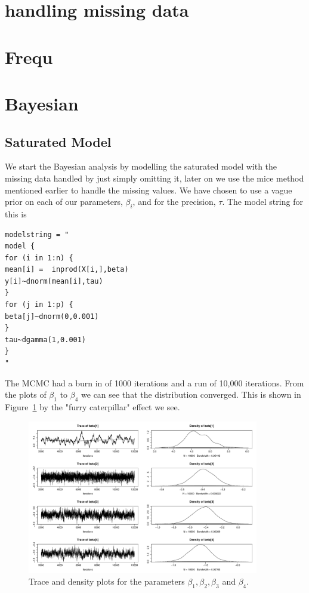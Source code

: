 \documentclass{article}
\begin{document}
\section{handling missing data}
\label{handling}
\section{Frequ}
\section{Bayesian}
\subsection{Saturated Model}
We start the Bayesian analysis by modelling the saturated model with the missing data handled by just simply omitting it, later on we use the mice method mentioned earlier to handle the missing values. We have chosen to use a vague prior on each of our parameters, $\beta_i$, and for the precision, $\tau$. The model string  for this is 
\begin{verbatim}
modelstring = "
model {
for (i in 1:n) {
mean[i] =  inprod(X[i,],beta)
y[i]~dnorm(mean[i],tau)
}
for (j in 1:p) {
beta[j]~dnorm(0,0.001)
}
tau~dgamma(1,0.001)
}
"
\end{verbatim}
The MCMC had a burn in of 1000 iterations and a run of 10,000 iterations. From the plots of $\beta_1$ to $\beta_4$ we can see that the distribution converged. This is shown in Figure~\ref{saturated_beta1-4} by the "furry caterpillar" effect we see.
\begin{figure}[H]
\centering
\includegraphics[width = 0.9\textwidth]{saturatedOutput/beta1-4.pdf}
\caption{Trace and density plots for the parameters $\beta_1, \beta_2, \beta_3$ and $\beta_4$.}
\label{saturated_beta1-4}
\end{figure}
\end{document}
